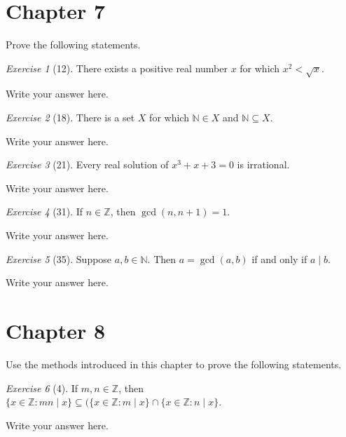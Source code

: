 \documentclass[12pt]{amsart}
\makeatletter
\theoremstyle{remark}
\newtheorem*{exercise}{Exercise}%
\def\NN{\ensuremath{\mathbb N}}
\def\ZZ{\ensuremath{\mathbb Z}}
\renewenvironment{proof}[1][\proofname]{\par\doublespacing
  \pushQED{\qed}%
  \normalfont \topsep6\p@\@plus6\p@\relax
  \list{}{%
    \settowidth{\leftmargin}{\itshape\proofname:\hskip\labelsep}%
    \setlength{\labelwidth}{0pt}%
    \setlength{\itemindent}{-\leftmargin}%
  }%
  \item[\hskip\labelsep\itshape#1\@addpunct{:}]\ignorespaces
}{%
  \popQED\endlist\@endpefalse
  \singlespacing
}
\theoremstyle{mycomment}
\makeatother
\begin{document}
\thispagestyle{fancy}

\section*{Chapter 7} Prove the following statements.
\begin{exercise}[12] There exists a positive real number $x$ for which $x^{2}<\sqrt{x}$.
\begin{proof}
Write your answer here.
\end{proof}
\end{exercise}

\begin{exercise}[18] There is a set $X$ for which $\NN\in X$ and $\NN\subseteq X$.
\begin{proof}
Write your answer here.
\end{proof}
\end{exercise}

\begin{exercise}[21] Every real solution of $x^{3}+x+3=0$ is irrational.
\begin{proof}
Write your answer here.
\end{proof}
\end{exercise}

\begin{exercise}[31] If $n\in\ZZ$, then $\gcd(n,n+1)=1$.
\begin{proof}
Write your answer here.
\end{proof}
\end{exercise}

\begin{exercise}[35] Suppose $a,b\in\NN$. Then $a=\gcd(a,b)$ if and only if $a\mid b$.
\begin{proof}
Write your answer here.
\end{proof}
\end{exercise}

\section*{Chapter 8}
Use the methods introduced in this chapter to prove the following statements.
\begin{exercise}[4] If $m,n\in\ZZ$, then $\{x\in \ZZ:mn\mid x\}\subseteq (\{x\in\ZZ:m\mid x\}\cap\{x\in\ZZ:n\mid x\}$.
\begin{proof}
Write your answer here.
\end{proof}
\end{exercise}
\end{document}
